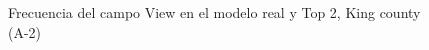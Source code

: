 \begin{figure}[H]
    \centering
    
    \caption{Frecuencia del campo View en el modelo real y Top 2, King county (A-2)}
    \label{frecuency-top2-view}
\end{figure}